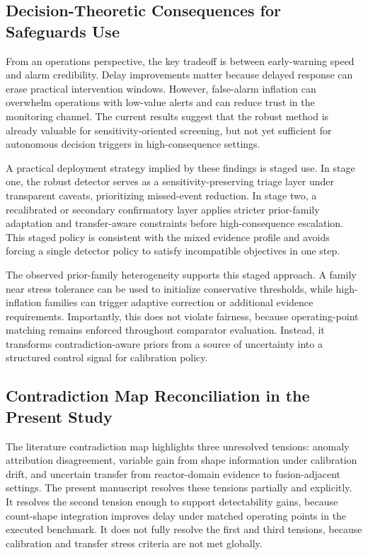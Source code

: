\documentclass{article} %
\begin{document}
\subsection{Decision-Theoretic Consequences for Safeguards Use}
From an operations perspective, the key tradeoff is between early-warning speed and alarm credibility. Delay improvements matter because delayed response can erase practical intervention windows. However, false-alarm inflation can overwhelm operations with low-value alerts and can reduce trust in the monitoring channel. The current results suggest that the robust method is already valuable for sensitivity-oriented screening, but not yet sufficient for autonomous decision triggers in high-consequence settings.

A practical deployment strategy implied by these findings is staged use. In stage one, the robust detector serves as a sensitivity-preserving triage layer under transparent caveats, prioritizing missed-event reduction. In stage two, a recalibrated or secondary confirmatory layer applies stricter prior-family adaptation and transfer-aware constraints before high-consequence escalation. This staged policy is consistent with the mixed evidence profile and avoids forcing a single detector policy to satisfy incompatible objectives in one step.

The observed prior-family heterogeneity supports this staged approach. A family near stress tolerance can be used to initialize conservative thresholds, while high-inflation families can trigger adaptive correction or additional evidence requirements. Importantly, this does not violate fairness, because operating-point matching remains enforced throughout comparator evaluation. Instead, it transforms contradiction-aware priors from a source of uncertainty into a structured control signal for calibration policy.

\subsection{Contradiction Map Reconciliation in the Present Study}
The literature contradiction map highlights three unresolved tensions: anomaly attribution disagreement, variable gain from shape information under calibration drift, and uncertain transfer from reactor-domain evidence to fusion-adjacent settings. The present manuscript resolves these tensions partially and explicitly. It resolves the second tension enough to support detectability gains, because count-shape integration improves delay under matched operating points in the executed benchmark. It does not fully resolve the first and third tensions, because calibration and transfer stress criteria are not met globally.
\end{document}
